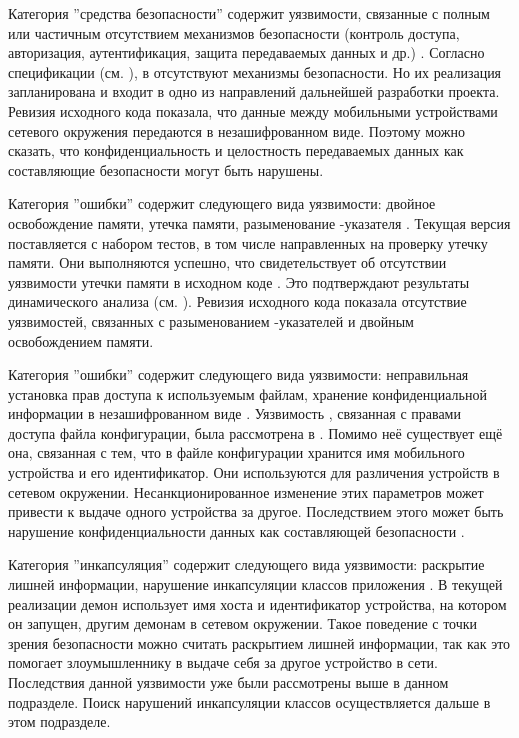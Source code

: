 %
Категория ''средства безопасности'' содержит уязвимости, связанные с полным или частичным отсутствием механизмов безопасности (контроль доступа, авторизация, аутентификация, защита передаваемых данных и др.) . 
%
Согласно спецификации (см. ), в  отсутствуют механизмы безопасности. 
%
Но их реализация запланирована и входит в одно из направлений дальнейшей разработки проекта. 
%
Ревизия исходного кода показала, что данные между мобильными устройствами сетевого окружения передаются в незашифрованном виде. 
%
Поэтому можно сказать, что конфиденциальность и целостность передаваемых данных как составляющие безопасности  могут быть нарушены. 

%
Категория ''ошибки'' содержит следующего вида уязвимости: двойное освобождение памяти, утечка памяти, разыменование -указателя . 
%
Текущая версия  поставляется с набором тестов, в том числе направленных на проверку утечку памяти. 
%
Они выполняются успешно, что свидетельствует об отсутствии уязвимости утечки памяти в исходном коде . 
%
Это подтверждают результаты динамического анализа (см. ). 
%
Ревизия исходного кода показала отсутствие уязвимостей, связанных с разыменованием -указателей и двойным освобождением памяти. 

%
Категория ''ошибки'' содержит следующего вида уязвимости: неправильная установка прав доступа к используемым файлам, хранение конфиденциальной информации в незашифрованном виде . 
%
Уязвимость , связанная с правами доступа файла конфигурации, была рассмотрена в . 
%
Помимо неё существует ещё она, связанная с тем, что в файле конфигурации хранится имя мобильного устройства и его идентификатор. 
%
Они используются для различения устройств в сетевом окружении. 
%
Несанкционированное изменение этих параметров может привести к выдаче одного устройства за другое. 
%
Последствием этого может быть нарушение конфиденциальности данных как составляющей безопасности . 

%
Категория ''инкапсуляция'' содержит следующего вида уязвимости: раскрытие лишней информации, нарушение инкапсуляции классов приложения . 
%
В текущей реализации  демон использует имя хоста и идентификатор устройства, на котором он запущен, другим демонам в сетевом окружении. 
%
Такое поведение с точки зрения безопасности можно считать раскрытием лишней информации, так как это помогает злоумышленнику в выдаче себя за другое устройство в сети. 
%
Последствия данной уязвимости уже были рассмотрены выше в данном подразделе.
%
Поиск нарушений инкапсуляции классов   осуществляется дальше в этом подразделе. 

